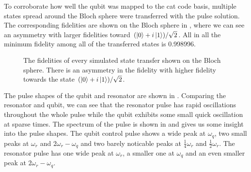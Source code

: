 \documentclass[main.tex]{subfiles}
\begin{document}
To corroborate how well the qubit was mapped to the cat code basis, multiple states spread around the Bloch sphere were transferred with the pulse solution.
The corresponding fidelities are shown on the Bloch sphere in , where we can see an asymmetry with larger fidelities toward \((\ket{0}+i\ket{1})/\sqrt{2}\).
All in all the minimum fidelity among all of the transferred states is 0.998996.

\begin{figure}[ht]
	\centering
	\caption{%
	The fidelities of every simulated state transfer shown on the Bloch sphere.
	There is an asymmetry in the fidelity with higher fidelity towards the state \((\ket{0}+i\ket{1})/\sqrt{2}\).
	}%
	\label{fig:bloch-fid}
\end{figure}


The pulse shapes of the qubit and resonator are shown in .
Comparing the resonator and qubit, we can see that the resonator pulse has rapid oscillations throughout the whole pulse while the qubit exhibits some small quick oscillation at sparse times.
The spectrum of the pulse is shown in  and gives us some insight into the pulse shapes.
The qubit control pulse shows a wide peak at \(\omega_q\), two small peaks at \(\omega_r\) and \(2\omega_r-\omega_q\) and two barely noticable peaks at \(\frac{1}{4}\omega_r\) and \(\frac{1}{2}\omega_r\). 
The resonator pulse has one wide peak at \(\omega_r\), a smaller one at \(\omega_q\) and an even smaller peak at \(2\omega_r-\omega_q\).
\end{document}
